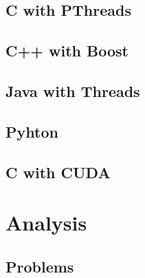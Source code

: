 \documentclass[11pt]{article} %
\begin{document}

\subsection{C with PThreads}
\subsection{C++ with Boost}
\subsection{Java with Threads}
\subsection{Pyhton}


\subsection{C with CUDA}
\section{Analysis}
\subsection{Problems}

\end{document}
